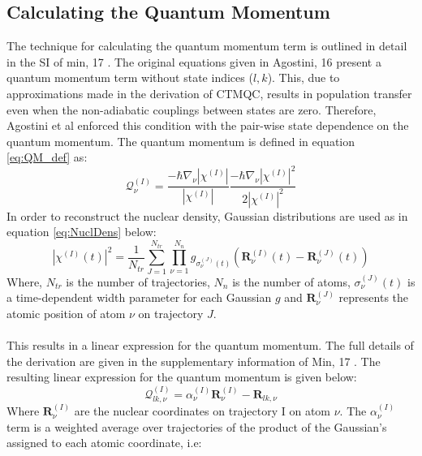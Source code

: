 \subsection{Calculating the Quantum Momentum \label{sec:calc_QM}}
 \label{sect:QM_Calc}
 The technique for calculating the quantum momentum term is outlined in detail in the SI of min, 17 \cite{min_ab_2017}. The original equations given in Agostini, 16\cite{agostini_quantum-classical_2016} present a quantum momentum term without state indices ($l, k$). This, due to approximations made in the derivation of CTMQC, results in population transfer even when the non-adiabatic couplings between states are zero. Therefore, Agostini et al enforced this condition with the pair-wise state dependence on the quantum momentum. The quantum momentum is defined in equation \eqref{eq:QM_def} as:
\begin{equation}
  \mathcal{Q}_{\nu}^{(I)} = \frac{-\hbar \nabla_{\nu} |\chi^{(I)}|}{|\chi^{(I)}|} \frac{-\hbar \nabla_{\nu}                            |\chi^{(I)}|^2}{2|\chi^{(I)}|^2}
  \label{eq:QM_def}
\end{equation}
In order to reconstruct the nuclear density, Gaussian distributions are used as in equation \eqref{eq:NuclDens} below:
\begin{equation}
	|\chi^{(I)}(t)|^2 = \frac{1}{N_{tr}} \sum_{J=1}^{N_{tr}} \prod_{\nu=1}^{N_n} g_{\sigma_{\nu}^{(J)}(t)} \left(\mathbf{R}_{\nu}^{(I)}(t) - \mathbf{R}_{\nu}^{(J)}(t)\right)
	\label{eq:NuclDens}
\end{equation}
Where, $N_{tr}$ is the number of trajectories, $N_{n}$ is the number of atoms, $\sigma_{\nu}^{(J)}(t)$ is a time-dependent width parameter for each Gaussian $g$ and $\mathbf{R}_{\nu}^{(J)}$ represents the atomic position of atom $\nu$ on trajectory $J$.
\\\\
This results in a linear expression for the quantum momentum.
The full details of the derivation are given in the supplementary information of Min, 17 \cite{min_ab_2017}. The resulting linear expression for the quantum momentum is given below:
\begin{equation}
  \mathcal{Q}_{lk, \nu}^{(I)} = \alpha_{\nu}^{(I)} \mathbf{R}_{\nu}^{(I)} - \mathbf{R}_{lk, \nu}
  \label{eq:QM_lin}
\end{equation}
Where $\mathbf{R}_{\nu}^{(I)}$ are the nuclear coordinates on trajectory I on atom $\nu$. The $\alpha_{\nu}^{(I)}$ term is a weighted  average over trajectories of the product of the Gaussian's assigned to each atomic coordinate, i.e:
